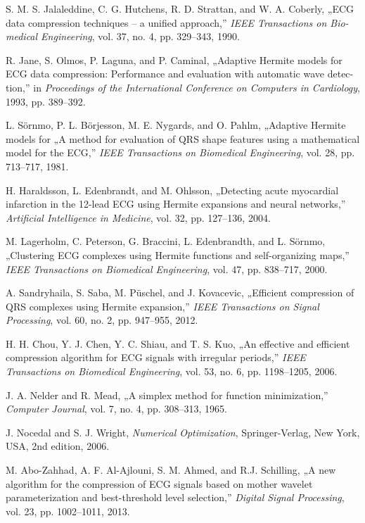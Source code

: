 \documentclass[oneside,titlepage,12pt,a4paper]{report}
\begin{document}
\begin{thebibliography}{9}

S. M. S. Jalaleddine, C. G. Hutchens, R. D. Strattan, and W. A. Coberly,
„ECG data compression techniques – a unified approach,”
\textit{IEEE Transactions on Bio-medical Engineering}, 
vol. 37, no. 4, pp. 329–343, 1990.
 
R. Jane, S. Olmos, P. Laguna, and P. Caminal,
„Adaptive Hermite models for
ECG data compression: Performance and evaluation with automatic wave detec-
tion,” in
\textit{Proceedings of the International Conference on Computers in Cardiology},
1993, pp. 389–392.
 
L. Sörnmo, P. L. Börjesson, M. E. Nygards, and O. Pahlm,
„Adaptive Hermite models for
„A method for evaluation of QRS shape features using a mathematical model for the ECG,” 
\textit{IEEE Transactions on Biomedical Engineering},
vol. 28, pp. 713–717, 1981.

H. Haraldsson, L. Edenbrandt, and M. Ohlsson,
„Detecting acute myocardial infarction in the 12-lead ECG using Hermite expansions and neural networks,”
\textit{Artificial Intelligence in Medicine},
vol. 32, pp. 127–136, 2004.

M. Lagerholm, C. Peterson, G. Braccini, L. Edenbrandth, and L. Sörnmo,
„Clustering ECG complexes using Hermite functions and self-organizing maps,”
\textit{IEEE Transactions on Biomedical Engineering},
vol. 47, pp. 838–717, 2000.

A. Sandryhaila, S. Saba, M. Püschel, and J. Kovacevic,
„Efficient compression of QRS complexes using Hermite expansion,”
\textit{IEEE Transactions on Signal Processing},
vol. 60, no. 2, pp. 947–955, 2012.

H. H. Chou, Y. J. Chen, Y. C. Shiau, and T. S. Kuo,
„An effective and efficient compression algorithm for ECG signals with irregular periods,”
\textit{IEEE Transactions on Biomedical Engineering},
vol. 53, no. 6, pp. 1198–1205, 2006.

J. A. Nelder and R. Mead,
„A simplex method for function minimization,”
\textit{Computer Journal},
vol. 7, no. 4, pp. 308–313, 1965.

J. Nocedal and S. J. Wright,
\textit{Numerical Optimization},
Springer-Verlag, New York, USA, 2nd edition, 2006.

M. Abo-Zahhad, A. F. Al-Ajlouni, S. M. Ahmed, and R.J. Schilling,
„A new algorithm for the compression of ECG signals based on mother wavelet parameterization and best-threshold level selection,”
\textit{Digital Signal Processing},
vol. 23, pp. 1002–1011, 2013.


\end{thebibliography}
\end{document}

